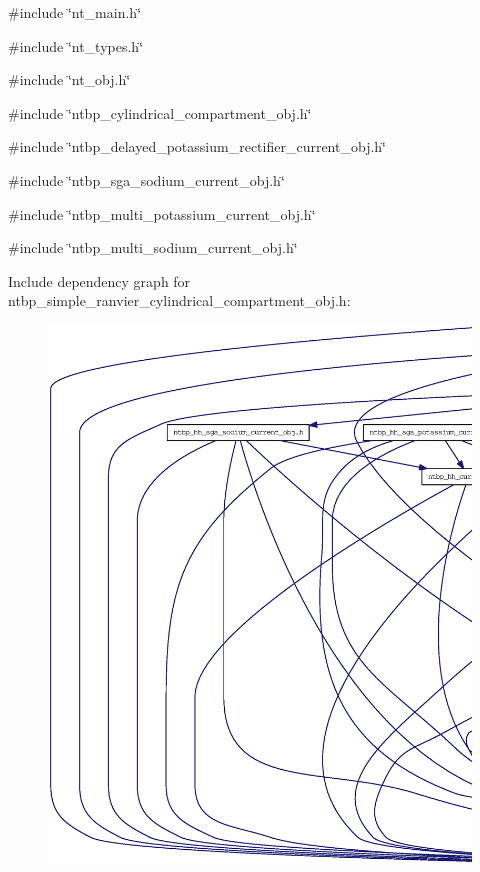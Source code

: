 {\ttfamily \#include \char`\"{}nt\_\-main.h\char`\"{}}\par
{\ttfamily \#include \char`\"{}nt\_\-types.h\char`\"{}}\par
{\ttfamily \#include \char`\"{}nt\_\-obj.h\char`\"{}}\par
{\ttfamily \#include \char`\"{}ntbp\_\-cylindrical\_\-compartment\_\-obj.h\char`\"{}}\par
{\ttfamily \#include \char`\"{}ntbp\_\-delayed\_\-potassium\_\-rectifier\_\-current\_\-obj.h\char`\"{}}\par
{\ttfamily \#include \char`\"{}ntbp\_\-sga\_\-sodium\_\-current\_\-obj.h\char`\"{}}\par
{\ttfamily \#include \char`\"{}ntbp\_\-multi\_\-potassium\_\-current\_\-obj.h\char`\"{}}\par
{\ttfamily \#include \char`\"{}ntbp\_\-multi\_\-sodium\_\-current\_\-obj.h\char`\"{}}\par
Include dependency graph for ntbp\_\-simple\_\-ranvier\_\-cylindrical\_\-compartment\_\-obj.h:
\nopagebreak
\begin{figure}[H]
\begin{center}
\leavevmode
\includegraphics[width=400pt]{ntbp__simple__ranvier__cylindrical__compartment__obj_8h__incl}
\end{center}
\end{figure}
